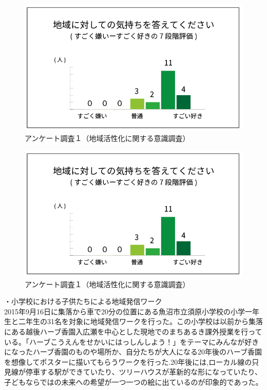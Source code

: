 \documentclass[a4paper]{jsarticle}
\begin{document}
\begin{figure}[h]
  \begin{center}
    \includegraphics[width=0.95\hsize]{./images/03}
    \caption{アンケート調査１（地域活性化に関する意識調査）}
    \label{fig:tmu_hino}
  \end{center}
\end{figure}
\begin{figure}[h]
  \begin{center}
    \includegraphics[width=0.95\hsize]{./images/03}
    \caption{アンケート調査１（地域活性化に関する意識調査）}
    \label{fig:tmu_hino}
  \end{center}
\end{figure}


・小学校における子供たちによる地域発信ワーク\\
2015年9月16日に集落から車で20分の位置にある魚沼市立須原小学校の小学一年生と二年生の31名を対象に地域発信ワークを行った。この小学校は以前から集落にある越後ハーブ香園入広瀬を中心とした現地でのまちあるき課外授業を行っている。「ハーブこうえんをせかいにはっしんしよう！」をテーマにみんなが好きになったハーブ香園のものや場所か、自分たちが大人になる20年後のハーブ香園を想像してポスターに描いてもらうワークを行った.20年後には,ローカル線の只見線が停車する駅ができていたり、ツリーハウスが革新的な形になっていたり、子どもならではの未来への希望が一つ一つの絵に出ているのが印象的であった。
\end{document}

